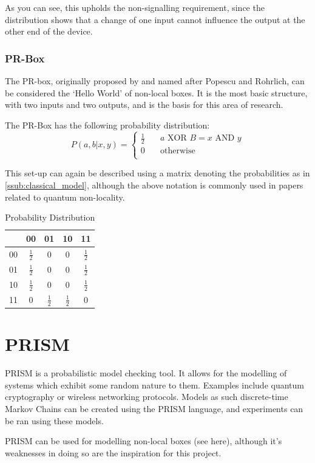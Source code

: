 \documentclass[report.tex]{subfiles}
\begin{document}
As you can see, this upholds the non-signalling requirement, since the
distribution shows that a change of one input cannot influence the output at the
other end of the device. 

\subsubsection{PR-Box} %
\label{ssub:pr_box}
The PR-box, originally proposed by and named after Popescu and Rohrlich, can be
considered the `Hello World' of non-local boxes. It is the most basic structure,
with two inputs and two outputs, and is the basis for this area of research.

The PR-Box has the following probability distribution:
\[
    P(a, b | x, y) = 
    \begin{cases}
        \frac{1}{2} & \quad a \text{ XOR } B = x \text{ AND } y \\
        0 & \quad \text{otherwise} \\
    \end{cases}
\]

This set-up can again be described using a matrix denoting the probabilities as
in \ref{ssub:classical_model}, although the above notation is commonly used in
papers related to quantum non-locality.

\begin{table}[H]
  \centering
\begin{tabular}{l | c c c c}
  & 00 & 01 & 10 & 11 \\
  \hline
  00 & \(\frac{1}{2}\) & 0 & 0 & \(\frac{1}{2}\) \\
  01 & \(\frac{1}{2}\) & 0 & 0 & \(\frac{1}{2}\) \\
  10 & \(\frac{1}{2}\) & 0 & 0 & \(\frac{1}{2}\) \\
  11 & 0 & \(\frac{1}{2}\) & \(\frac{1}{2}\) & 0 \\
\end{tabular}
  \caption{Probability Distribution}
  \label{tab:pr}
\end{table}


\section{PRISM} %
\label{sec:prism}
PRISM is a probabilistic model checking tool. It allows for
the modelling of systems which exhibit some random nature to them. Examples
include quantum cryptography or wireless networking protocols. Models as such
discrete-time Markov Chains can be created using the PRISM language, and
experiments can be ran using these models.

PRISM can be used for modelling non-local boxes (see here), although it's
weaknesses in doing so are the inspiration for this project.

\newpage
\end{document}
